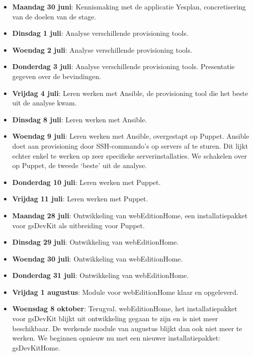\documentclass[a4paper,11pt]{article}
\theoremstyle{definition}
\begin{document}
\begin{itemize}
  \item \textbf{Maandag 30 juni}: Kennismaking met de applicatie Yesplan, 
  concretisering van de doelen van de stage.
    \item \textbf{Dinsdag 1 juli}: Analyse verschillende provisioning tools.
        \item \textbf{Woendag 2 juli}: Analyse verschillende provisioning tools.    
     \item \textbf{Donderdag 3 juli}: Analyse verschillende provisioning tools. 
     Presentatie gegeven over de bevindingen.
    \item \textbf{Vrijdag 4 juli}: Leren werken met Ansible, de provisioning 
    tool die het beste uit de analyse kwam.
      \item \textbf{Dinsdag 8 juli}: Leren werken met Ansible.
    \item \textbf{Woendag 9 juli}: Leren werken met Ansible, overgestapt op 
    Puppet. Ansible doet aan provisioning door SSH-commando's op servers af te 
    sturen. Dit lijkt echter enkel te werken op zeer specifieke 
    serverinstallaties. We schakelen over op Puppet, de tweede `beste' uit de 
    analyse.
    \item \textbf{Donderdag 10 juli}: Leren werken met Puppet.
     \item \textbf{Vrijdag 11 juli}: Leren werken met Puppet.
 \item \textbf{Maandag 28 juli}: Ontwikkeling van webEditionHome, een 
 installatiepakket voor gsDevKit als uitbreiding voor Puppet.
\item \textbf{Dinsdag 29 juli}: Ontwikkeling van webEditionHome.
    \item \textbf{Woendag 30 juli}: Ontwikkeling van webEditionHome.    
\item \textbf{Donderdag 31 juli}: Ontwikkeling van webEditionHome.
    \item \textbf{Vrijdag 1 augustus}: Module voor webEditionHome klaar en 
    opgeleverd.
    \item \textbf{Woensdag 8 oktober}: Terugval. webEditionHome, het installatiepakket voor gsDevKit blijkt uit 
    ontwikkeling gegaan te zijn en is niet meer beschikbaar. De werkende module 
    van augustus blijkt dan ook niet meer te werken. We beginnen opnieuw nu met 
    een nieuwer installatiepakket: gsDevKitHome.
    

\end{itemize}
\end{document}
